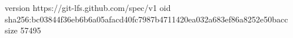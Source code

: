 version https://git-lfs.github.com/spec/v1
oid sha256:bc03844f36eb6b6a05afacd40fc7987b4711420ea032a683ef86a8252e50bacc
size 57495
